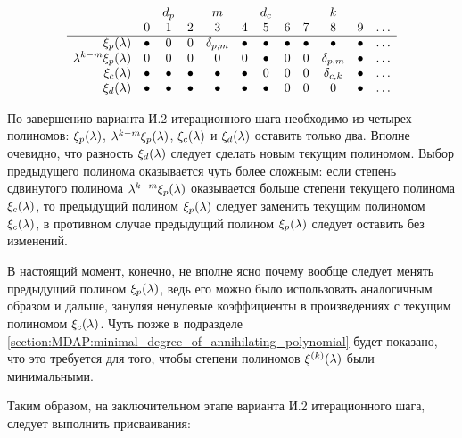 	$$
		\begin{array}{rccccccccccc}
			                                 &         & d_p     &         & m            &         & d_c     &         &         & k            & \\
			                                 & 0       & 1       & 2       & 3            & 4       & 5       & 6       & 7       & 8            & 9       & \dots \\
			\hline
			\xi_p (\lambda)               & \bullet & 0       & 0       & \delta_{p,m} & \bullet & \bullet & \bullet & \bullet & \bullet      & \bullet & \dots \\
			\lambda^{k-m} \xi_p (\lambda) & 0       & 0       & 0       & 0            & 0       & \bullet & 0       & 0       & \delta_{p,m} & \bullet & \dots \\
			\xi_c (\lambda)               & \bullet & \bullet & \bullet & \bullet      & \bullet & 0       & 0       & 0       & \delta_{c,k} & \bullet & \dots \\
			\xi_d (\lambda)               & \bullet & \bullet & \bullet & \bullet      & \bullet & \bullet & 0       & 0       & 0            & \bullet & \dots \\
		\end{array}
	$$

По завершению варианта И.2 итерационного шага необходимо из четырех полиномов: $\xi_p (\lambda)$, $\lambda^{k-m} \xi_p (\lambda)$,
$\xi_c (\lambda)$ и $\xi_d (\lambda)$ оставить только два. Вполне очевидно, что разность $\xi_d (\lambda)$ следует сделать новым
текущим полиномом. Выбор предыдущего полинома оказывается чуть более сложным: если степень сдвинутого полинома $\lambda^{k-m} \xi_p (\lambda)$
оказывается больше степени текущего полинома $\xi_c (\lambda)$, то предыдущий полином $\xi_p (\lambda)$ следует заменить текущим полиномом
$\xi_c (\lambda)$, в противном случае предыдущий полином $\xi_p (\lambda)$ следует оставить без изменений.

В настоящий момент, конечно, не вполне ясно почему вообще следует менять предыдущий полином $\xi_p (\lambda)$, ведь его можно было
использовать аналогичным образом и дальше, зануляя ненулевые коэффициенты в произведениях с текущим полиномом $\xi_c (\lambda)$. Чуть позже
в подразделе \ref{section:MDAP:minimal_degree_of_annihilating_polynomial} будет показано, что это требуется для того, чтобы степени
полиномов $\xi^{(k)} (\lambda)$ были минимальными.

Таким образом, на заключительном этапе варианта И.2 итерационного шага, следует выполнить присваивания:

